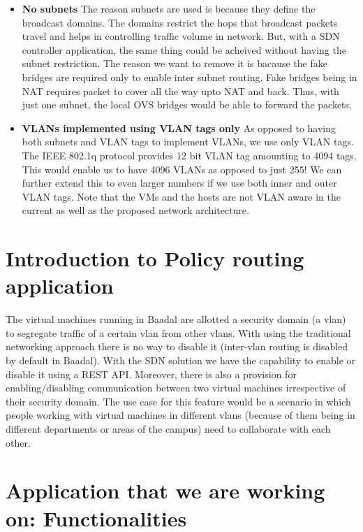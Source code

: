\begin{itemize}
    \item \textbf{No subnets} The reason subnets are used is because they define the broadcast
domains. The domains restrict the hops that broadcast packets travel and
helps in controlling traffic volume in network. But, with a SDN controller
application, the same thing could be acheived without having the subnet
restriction. The reason we want to remove it is bacause the fake bridges
are required only to enable inter subnet routing. Fake bridges being in
NAT requires packet to cover all the way upto NAT and back. Thus,
with just one subnet, the local OVS bridges would be able to forward the
packets.
\item \textbf{VLANs implemented using VLAN tags only} As opposed to having both
subnets and VLAN tags to implement VLANs, we use only VLAN tags.
The IEEE 802.1q protocol provides 12 bit VLAN tag amounting to 4094
tags. This would enable us to have 4096 VLANs as opposed to just 255!
We can further extend this to even larger numbers if we use both inner
and outer VLAN tags. Note that the VMs and the hosts are not VLAN
aware in the current as well as the proposed network architecture.

\end{itemize}

\section{Introduction to Policy routing application}
The virtual machines running in Baadal are allotted a security domain (a vlan) to segregate traffic of a certain vlan from other vlans. With using the traditional networking approach there is no way to disable it (inter-vlan routing is disabled by default in Baadal). With the SDN solution we have the capability to enable or disable it using a REST API. Moreover, there is also a provision for enabling/disabling communication between two virtual machines irrespective of their security domain. The use case for this feature would be a scenario in which people working with virtual machines in different vlans (because of them being in different departments or areas of the campus) need to collaborate with each other.

\section{Application that we are working on: Functionalities}

